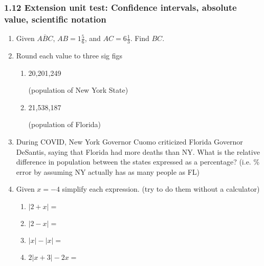 

\fancyhead[LE]{\thepage}



\subsubsection*{1.12 Extension unit test: Confidence intervals, absolute value, scientific notation}
\begin{enumerate}
\item Given $\overline{ABC}$, $AB=1 \frac{5}{6}$, and $AC=6 \frac{1}{3}$. Find ${BC}$. \par \bigskip
{} \vspace{1cm}

\item Round each value to three sig figs
\begin{multicols}{2}
  \begin{enumerate}
    \item 20,201,249 \par \medskip (population of New York State)
    \item 21,538,187 \par \medskip (population of Florida)
  \end{enumerate}
\end{multicols}

\item During COVID, New York Governor Cuomo criticized Florida Governor DeSantis, saying that Florida had more deaths than NY. What is the relative difference in population between the states expressed as a percentage? (i.e. \% error by assuming NY actually has as many people as FL) \vspace{2cm}

\item Given $x=-4$ simplify each expression. (try to do them without a calculator)
\begin{multicols}{2}
  \begin{enumerate}[itemsep=1.25cm]
    \item $|2+x|=$
    \item $|2-x|=$
    \item $|x|-|x|=$
    \item $2 |x+3|-2x=$
  \end{enumerate}
\end{multicols} \vspace{1cm}


\end{enumerate}
